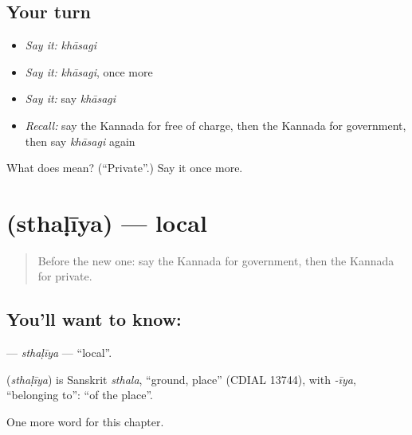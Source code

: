 \subsection*{Your turn}
\begin{itemize}
\raggedright
  \item \emph{Say it:} \emph{khāsagi}
  \item \emph{Say it:} \emph{khāsagi}, once more
  \item \emph{Say it:} say \emph{khāsagi}
  \item \emph{Recall:} say the Kannada for free of charge, then the Kannada for government, then say \emph{khāsagi} again
\end{itemize}

\begin{tcolorbox}[breakable,colback=teal!4,colframe=teal!35!black,title={Before you move on}]
What does  mean? (\textquotedblleft{}Private\textquotedblright{}.) Say it once more.
\end{tcolorbox}
\section[\texorpdfstring{\kn{ಸ್ಥಳೀಯ} (sthaḷīya)}{ಸ್ಥಳೀಯ (sthaḷīya)}]{ (sthaḷīya) — local}

\label{lesson:KA-C180-sthaliya}



\begin{quote}
Before the new one: say the Kannada for government, then the Kannada for private.
\end{quote}

\subsection*{You'll want to know: }
\textbf{} — \emph{sthaḷīya} — \textquotedblleft{}local\textquotedblright{}.

\begin{cousinweb}
\textbf{} (\emph{sthaḷīya}) is Sanskrit \emph{sthala}, \textquotedblleft{}ground, place\textquotedblright{} (CDIAL 13744), with \emph{-īya}, \textquotedblleft{}belonging to\textquotedblright{}: \textquotedblleft{}of the place\textquotedblright{}.
\end{cousinweb}

\begin{grammarlens}[title={What you've built}]
One more word for this chapter.
\end{grammarlens}

